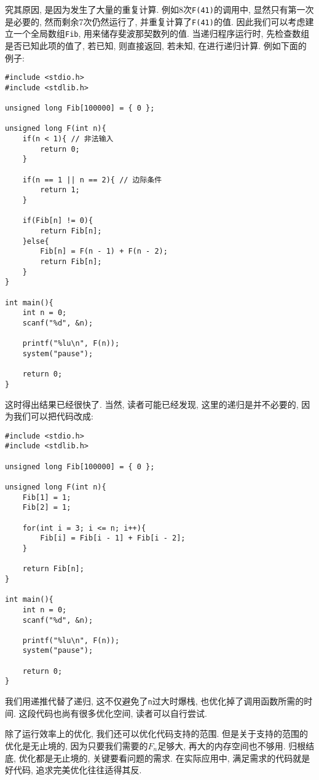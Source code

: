         究其原因, 是因为发生了大量的重复计算. 例如8次\texttt{F(41)}的调用中, 显然只有第一次是必要的, 然而剩余7次仍然运行了, 并重复计算了\texttt{F(41)}的值. 因此我们可以考虑建立一个全局数组\texttt{Fib}, 用来储存斐波那契数列的值. 当递归程序运行时, 先检查数组是否已知此项的值了, 若已知, 则直接返回, 若未知, 在进行递归计算. 例如下面的例子:
\begin{lstlisting}
#include <stdio.h>
#include <stdlib.h>

unsigned long Fib[100000] = { 0 };

unsigned long F(int n){
    if(n < 1){ // 非法输入
        return 0;
    }

    if(n == 1 || n == 2){ // 边际条件
        return 1;
    }

    if(Fib[n] != 0){
        return Fib[n];
    }else{
        Fib[n] = F(n - 1) + F(n - 2);
        return Fib[n];
    }
}

int main(){
    int n = 0;
    scanf("%d", &n);

    printf("%lu\n", F(n));
    system("pause");

    return 0;
}
\end{lstlisting}

        这时得出结果已经很快了. 当然, 读者可能已经发现, 这里的递归是并不必要的, 因为我们可以把代码改成:
\begin{lstlisting}
#include <stdio.h>
#include <stdlib.h>

unsigned long Fib[100000] = { 0 };

unsigned long F(int n){
    Fib[1] = 1;
    Fib[2] = 1;

    for(int i = 3; i <= n; i++){
        Fib[i] = Fib[i - 1] + Fib[i - 2];
    }

    return Fib[n];
}

int main(){
    int n = 0;
    scanf("%d", &n);

    printf("%lu\n", F(n));
    system("pause");

    return 0;
}
\end{lstlisting}
        
        我们用递推代替了递归, 这不仅避免了\texttt{n}过大时爆栈, 也优化掉了调用函数所需的时间. 这段代码也尚有很多优化空间, 读者可以自行尝试.

        除了运行效率上的优化, 我们还可以优化代码支持的范围. 但是关于支持的范围的优化是无止境的, 因为只要我们需要的$F_n$足够大, 再大的内存空间也不够用. 归根结底, 优化都是无止境的, 关键要看问题的需求. 在实际应用中, 满足需求的代码就是好代码, 追求完美优化往往适得其反.
        
